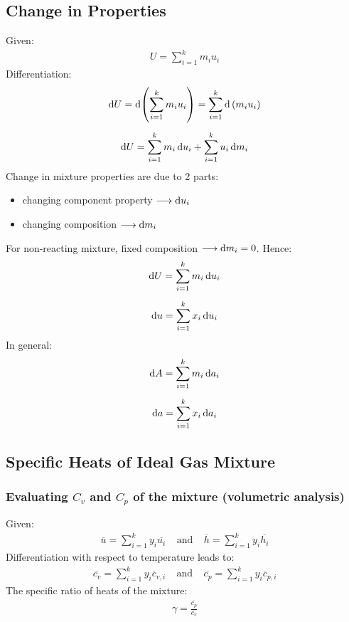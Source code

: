 \documentclass[class=report, crop=false, 12pt,a4paper]{standalone}
\begin{document}
\subsection{Change in Properties}
Given:
\begin{gather}
  U = \sum_{i=1}^{k}m_i u_i
\end{gather}
Differentiation:
\begin{gather}
  \dif U = \dif\left(\sum_{i=1}^{k}m_i u_i\right) = \sum_{i=1}^{k}\dif\ (m_i u_i) \\[5pt]
  \dif U = \sum_{i=1}^{k}m_i\dif u_i + \sum_{i=1}^{k}u_i\dif m_i
\end{gather}
Change in mixture properties are due to 2 parts:
\begin{itemize}[noitemsep]
  \item changing component property $\longrightarrow \dif u_i$
  \item changing composition $\longrightarrow \dif m_i$
\end{itemize}
For non-reacting mixture, fixed composition $\longrightarrow \dif m_i = 0$. Hence:
\begin{gather}
  \dif U = \sum_{i=1}^{k}m_i\dif u_i \\[5pt]
  \dif u = \sum_{i=1}^{k}x_i\dif u_i
\end{gather}
In general:
\begin{gather}
  \dif A = \sum_{i=1}^{k}m_i \dif a_i \\[5pt]
  \dif a = \sum_{i=1}^{k}x_i \dif a_i
\end{gather}
\subsection{Specific Heats of Ideal Gas Mixture}
\subsubsection{Evaluating $C_v$ and $C_p$ of the mixture (volumetric analysis)}
Given:
\begin{gather}
  \overline{u} = \sum_{i=1}^{k}y_i\overline{u_i} \ \ \ \ \ \text{and} \ \ \ \ \ \overline{h} = \sum_{i=1}^{k}y_i\overline{h_i}
\end{gather}
Differentiation with respect to temperature leads to:
\begin{gather}
  \overline{c_v} = \sum_{i=1}^{k}y_i\overline{c}_{v,i} \ \ \ \ \ \text{and} \ \ \ \ \ \overline{c_p} = \sum_{i=1}^{k}y_i\overline{c}_{p,i}
\end{gather}
The specific ratio of heats of the mixture:
\begin{gather}
  \gamma = \frac{\overline{c_p}}{\overline{c_v}}
\end{gather}
\end{document}
